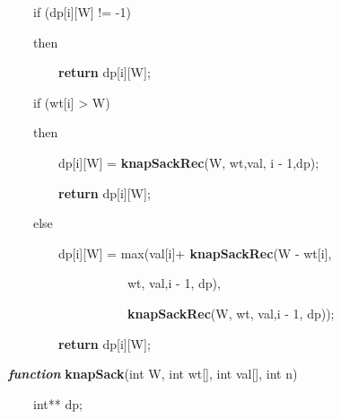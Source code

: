 \documentclass[letterpaper]{article}
\begin{document}
\begin{multicols}{2}
{\color[rgb]{0.2509804,0.25882354,0.30588236}
\ \ \ \ if (dp[i][W] != -1)}

{\color[rgb]{0.2509804,0.25882354,0.30588236}
\ \ \ \ then}

\textcolor[rgb]{0.2509804,0.25882354,0.30588236}{\ \ \ \ \ \ \ \ }\textbf{\textcolor[rgb]{0.2509804,0.25882354,0.30588236}{return}}\textcolor[rgb]{0.2509804,0.25882354,0.30588236}{
dp[i][W];}

{\color[rgb]{0.2509804,0.25882354,0.30588236}
\ \ \ \ if (wt[i] {\textgreater} W) }

{\color[rgb]{0.2509804,0.25882354,0.30588236}
\ \ \ \ then}

\textcolor[rgb]{0.2509804,0.25882354,0.30588236}{\ \ \ \ \ \ \ \ dp[i][W] =
}\textbf{\textcolor[rgb]{0.2509804,0.25882354,0.30588236}{knapSackRec}}\textcolor[rgb]{0.2509804,0.25882354,0.30588236}{(W,
wt,val, i - 1,dp);}

\textcolor[rgb]{0.2509804,0.25882354,0.30588236}{\ \ \ \ \ \ \ \ }\textbf{\textcolor[rgb]{0.2509804,0.25882354,0.30588236}{return}}\textcolor[rgb]{0.2509804,0.25882354,0.30588236}{
dp[i][W];}

{\color[rgb]{0.2509804,0.25882354,0.30588236}
\ \ \ \ else}

\textcolor[rgb]{0.2509804,0.25882354,0.30588236}{\ \ \ \ \ \ \ \ dp[i][W] =
max(val[i]+}\textbf{\textcolor[rgb]{0.2509804,0.25882354,0.30588236}{
knapSackRec}}\textcolor[rgb]{0.2509804,0.25882354,0.30588236}{(W - wt[i],}

{\color[rgb]{0.2509804,0.25882354,0.30588236}
\ \ \ \ \ \ \ \ \ \ \ \ \ \ \ \ \ \ \ wt, val,i - 1, dp),}

\textcolor[rgb]{0.2509804,0.25882354,0.30588236}{\ \ \ \ \ \ \ \ \ \ \ \ \ \ \ \ \ \ \ }\textbf{\textcolor[rgb]{0.2509804,0.25882354,0.30588236}{knapSackRec}}\textcolor[rgb]{0.2509804,0.25882354,0.30588236}{(W,
wt, val,i - 1, dp));}

\textcolor[rgb]{0.2509804,0.25882354,0.30588236}{\ \ \ \ \ \ \ \ }\textbf{\textcolor[rgb]{0.2509804,0.25882354,0.30588236}{return}}\textcolor[rgb]{0.2509804,0.25882354,0.30588236}{
dp[i][W];}


\bigskip

\textbf{\textit{\textcolor[rgb]{0.2509804,0.25882354,0.30588236}{function}}}\textcolor[rgb]{0.2509804,0.25882354,0.30588236}{
}\textbf{\textcolor[rgb]{0.2509804,0.25882354,0.30588236}{knapSack}}\textcolor[rgb]{0.2509804,0.25882354,0.30588236}{(int
W, int wt[], int val[], int n)}

{\color[rgb]{0.2509804,0.25882354,0.30588236}
\ \ \ \ int** dp;}


\end{multicols}
\end{document}
